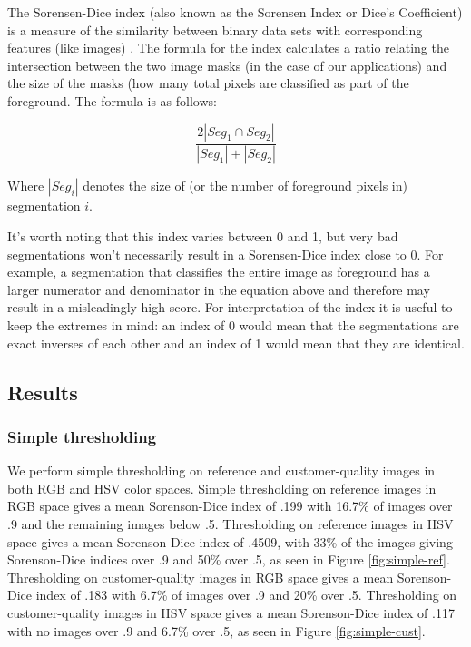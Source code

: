 \documentclass{article}
\begin{document}
The Sorensen-Dice index (also known as the Sorensen Index or Dice’s Coefficient) is a measure of the similarity between binary data sets with corresponding features (like images) \cite{dice}. The formula for the index calculates a ratio relating the intersection between the two image masks (in the case of our applications) and the size of the masks (how many total pixels are classified as part of the foreground. The formula is as follows:

$$ \frac{2|Seg_1 \cap Seg_2|}{|Seg_1| + |Seg_2|} $$

Where $|Seg_i|$ denotes the size of (or the number of foreground pixels in) segmentation $i$. 

It’s worth noting that this index varies between 0 and 1, but very bad segmentations won’t necessarily result in a Sorensen-Dice index close to 0. For example, a segmentation that classifies the entire image as foreground has a larger numerator and denominator in the equation above and therefore may result in a misleadingly-high score. For interpretation of the index it is useful to keep the extremes in mind: an index of 0 would mean that the segmentations are exact inverses of each other and an index of 1 would mean that they are identical. 

\subsection{Results}
\label{evaluation}

\subsubsection{Simple thresholding}

We perform simple thresholding on reference and customer-quality images in both RGB and HSV color spaces. Simple thresholding on reference images in RGB space gives a mean Sorenson-Dice index of .199 with 16.7\% of images over .9 and the remaining images below .5. Thresholding on reference images in HSV space gives a mean Sorenson-Dice index of .4509, with 33\% of the images giving Sorenson-Dice indices over .9 and 50\% over .5, as seen in Figure \ref{fig:simple-ref}. Thresholding on customer-quality images in RGB space gives a mean Sorenson-Dice index of .183 with 6.7\% of images over .9 and 20\% over .5. Thresholding on customer-quality images in HSV space gives a mean Sorenson-Dice index of .117 with no images over .9 and 6.7\% over .5, as seen in Figure \ref{fig:simple-cust}.
\end{document}
